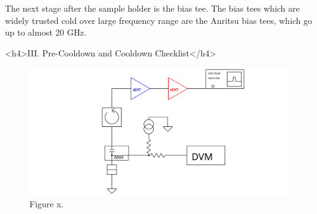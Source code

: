 \documentclass[11pt]{article}
\begin{document}
    The next stage after the sample holder is the bias tee.  The bias tees which are widely trusted cold over large frequency range are the Anritsu bias tees, which go up to almost 20 GHz.

<h4>III. Pre-Cooldown and Cooldown Checklist</h4>

\begin{figure}

\includegraphics[width=\linewidth]{../svg/svg1519861628.svg}

\caption{Figure x. }
\end{figure}
\end{document}
